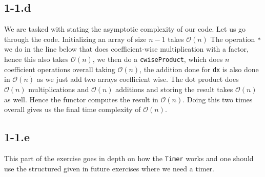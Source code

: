 \documentclass{article}
\begin{document}
\pagebreak


\subsection*{1-1.d}
We are tasked with stating the asymptotic complexity of our code. Let us go through the code. Initializing an array of size $n-1$ takes $\mathcal{O}\left(n\right)$ The operation \verb|*| we do in the line below that does coefficient-wise multiplication with a factor, hence this also takes $\mathcal{O}\left(n\right)$, we then do a \verb|cwiseProduct|, which does $n$ coefficient operations overall taking $\mathcal{O}\left(n\right)$, the addition done for \verb|dx| is also done in $\mathcal{O}\left(n\right)$ as we just add two arrays coefficient wise. The dot product does $\mathcal{O}\left(n\right)$ multiplications and $\mathcal{O}\left(n\right)$ additions and storing the result takes $\mathcal{O}\left(n\right)$ as well. Hence the functor computes the result in $\mathcal{O}\left(n\right)$. Doing this two times overall gives us the final time complexity of $\mathcal{O}\left(n\right)$.

\subsection*{1-1.e}
This part of the exercise goes in depth on how the \verb|Timer| works and one should use the structured given in future exercises where we need a timer.
\end{document}
